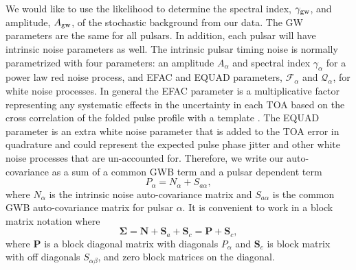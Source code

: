 \documentclass[iop]{emulateapj}
\newcommand{\be}{\begin{equation}}
\newcommand{\ee}{\end{equation}}
\begin{document}
We would like to use the likelihood to determine the spectral index, $\gamma_{\rm gw}$, and amplitude, $A_{\rm gw}$,  of the stochastic background from our data. The GW parameters are the same for all pulsars. In addition, each pulsar will have intrinsic noise parameters as well. The intrinsic pulsar timing noise is normally parametrized with four parameters: an amplitude $A_{\alpha}$ and spectral index $\gamma_{\alpha}$ for a power law red noise process, and EFAC and EQUAD parameters, $\mathcal{F}_{\alpha}$ and $\mathcal{Q}_{\alpha}$, for white noise processes. In general the EFAC parameter is a multiplicative factor representing any systematic effects in the uncertainty in each TOA based on the cross correlation of the folded pulse profile with a template \citep{twdw92}. The EQUAD parameter is an extra white noise parameter that is added to the TOA error in quadrature and could represent the expected pulse phase jitter \citep{cs10} and other white noise processes that are un-accounted for.  Therefore, we write our auto-covariance as a sum of a common GWB term and a pulsar dependent term
\be
P_{\alpha}=N_{\alpha}+S_{a\alpha},
\ee
where $N_{\alpha}$ is the intrinsic noise auto-covariance matrix and $S_{a\alpha}$ is the common GWB auto-covariance matrix for pulsar $\alpha$. It is convenient to work in a block matrix notation where
\be
\boldsymbol{\Sigma}=\mathbf{N}+\mathbf{S}_{a}+\mathbf{S}_{c}=\mathbf{P}+\mathbf{S}_{c},
\ee
where $\mathbf{P}$ is a block diagonal matrix with diagonals $P_{\alpha}$ and $\mathbf{S}_{c}$ is block matrix with off diagonals $S_{\alpha\beta}$, and zero block matrices on the diagonal.
\end{document}
